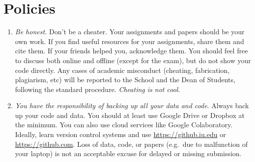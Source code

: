 \documentclass[11pt,article,oneside]{memoir} %
\begin{document}
\section{Policies}%
\begin{enumerate}%
    \setlength\itemsep{1em}


\item \emph{Be honest.} Don't be a cheater. Your assignments and papers should be your own work.  
If you find useful resources for your assignments, share them and cite them. 
If your friends helped you, acknowledge them. 
You should feel free to discuss both online and offline (except for the exam), but do not show your code directly.  
Any cases of academic misconduct (cheating, fabrication, plagiarism, etc) will be reported to the School and the Dean of Students, following the standard procedure. 
\emph{Cheating is not cool}. 


\item \emph{You have the responsibility of backing up all your data and code}.
Always back up your code and data. You should at least use Google Drive or Dropbox at the minimum.
You can also use cloud services like Google Colaboratory.
Ideally, learn version control systems and use \url{https://github.iu.edu} or \url{https://github.com}. 
Loss of data, code, or papers (e.g.~due to malfunction of your laptop) is not an acceptable excuse for delayed or missing submission. 


\end{enumerate}
\end{document}
